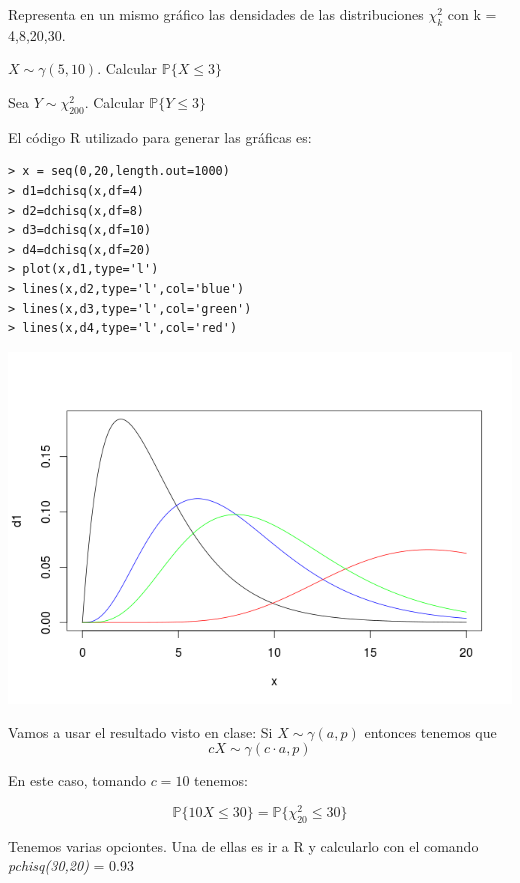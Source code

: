 \begin{problem}[3]

\ppart Representa en un mismo gráfico las densidades de las distribuciones $\chi^2_k $ con k = 4,8,20,30.

\ppart $X \sim \gamma(5,10)$. Calcular $\mathbb{P}\{X\leq 3\}$

\ppart Sea $Y \sim \chi_{200}^2$. Calcular $\mathbb{P}\{Y\leq 3\}$

\solution
\spart
El código R utilizado para generar las gráficas es:

\begin{verbatim}
> x = seq(0,20,length.out=1000)
> d1=dchisq(x,df=4)
> d2=dchisq(x,df=8)
> d3=dchisq(x,df=10)
> d4=dchisq(x,df=20)
> plot(x,d1,type='l')
> lines(x,d2,type='l',col='blue')
> lines(x,d3,type='l',col='green')
> lines(x,d4,type='l',col='red')
\end{verbatim}

\begin{center}
\includegraphics[width=1\textwidth]{img/Chicuadrado.png}
\label{Ejercicio 4}
\end{center}

\spart
Vamos a usar el resultado visto en clase:
Si $X\sim \gamma(a,p)$ entonces tenemos que 
\[cX \sim \gamma(c\cdot a, p)\]

En este caso, tomando $c=10$ tenemos:

\[\mathbb{P}\{10X\leq 30\} = \mathbb{P}\{\chi^2_{20 }\leq 30\}  \]

Tenemos varias opciontes. Una de ellas es ir a R y calcularlo con el comando \emph{pchisq(30,20)} = 0.93


\end{problem}
